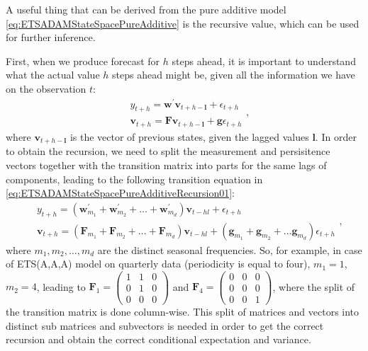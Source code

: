 \documentclass[]{book}
\theoremstyle{definition}
\theoremstyle{definition}
\theoremstyle{definition}
\theoremstyle{definition}
\theoremstyle{remark}
\begin{document}
A useful thing that can be derived from the pure additive model \eqref{eq:ETSADAMStateSpacePureAdditive} is the recursive value, which can be used for further inference.

First, when we produce forecast for \(h\) steps ahead, it is important to understand what the actual value \(h\) steps ahead might be, given all the information we have on the observation \(t\):
\begin{equation}
  \begin{aligned}
    & {y}_{t+h} = \mathbf{w}^\prime \mathbf{v}_{t+h-\mathbf{l}} + \epsilon_{t+h} \\
    & \mathbf{v}_{t+h} = \mathbf{F} \mathbf{v}_{t+h-\mathbf{l}} + \mathbf{g} \epsilon_{t+h}
  \end{aligned},
  \label{eq:ETSADAMStateSpacePureAdditiveRecursion01}
\end{equation}
where \(\mathbf{v}_{t+h-\mathbf{l}}\) is the vector of previous states, given the lagged values \(\mathbf{l}\). In order to obtain the recursion, we need to split the measurement and persisitence vectors together with the transition matrix into parts for the same lags of components, leading to the following transition equation in \eqref{eq:ETSADAMStateSpacePureAdditiveRecursion01}:
\begin{equation}
  \begin{aligned}
    & {y}_{t+h} = (\mathbf{w}_{m_1}^\prime + \mathbf{w}_{m_2}^\prime + \dots + \mathbf{w}_{m_d}^\prime) \mathbf{v}_{t-h{l}} + \epsilon_{t+h} \\
    & \mathbf{v}_{t+h} = (\mathbf{F}_{m_1} + \mathbf{F}_{m_2} + \dots + \mathbf{F}_{m_d}) \mathbf{v}_{t-h{l}} + (\mathbf{g}_{m_1} + \mathbf{g}_{m_2} + \dots \mathbf{g}_{m_d}) \epsilon_{t+h}
  \end{aligned},
  \label{eq:ETSADAMStateSpacePureAdditiveRecursion02}
\end{equation}
where \(m_1, m_2, \dots, m_d\) are the distinct seasonal frequencies. So, for example, in case of ETS(A,A,A) model on quarterly data (periodicity is equal to four), \(m_1=1\), \(m_2=4\), leading to \(\mathbf{F}_{1} = \begin{pmatrix} 1 & 1 & 0 \\ 0 & 1 & 0 \\ 0 & 0 & 0 \end{pmatrix}\) and \(\mathbf{F}_{4} = \begin{pmatrix} 0 & 0 & 0 \\ 0 & 0 & 0 \\ 0 & 0 & 1 \end{pmatrix}\), where the split of the transition matrix is done column-wise. This split of matrices and vectors into distinct sub matrices and subvectors is needed in order to get the correct recursion and obtain the correct conditional expectation and variance.
\end{document}
